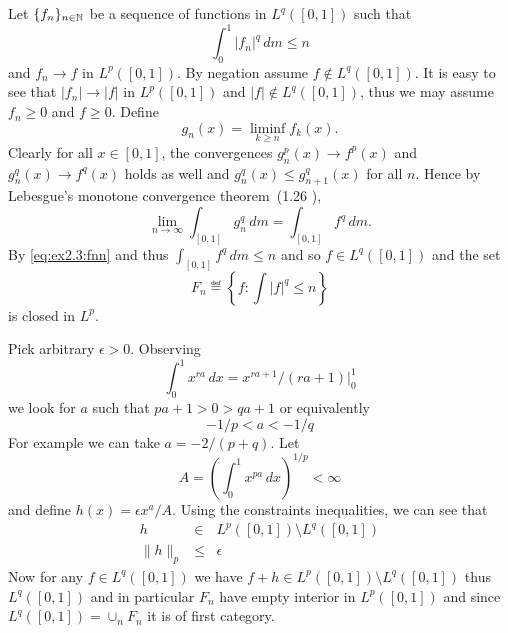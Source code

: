 \begin{enumerate}
\begin{itemize}
  Let \(\{f_n\}_{n\in\mathbb{N}}\) be a sequence of functions in \(L^q([0,1])\)
  such that 
  \begin{equation*} \label{eq:ex2.3:fnn}
  \int_0^1 |f_n|^q\,dm \leq n
  \end{equation*}
  and
  \(f_n\to f\) in \(L^p([0,1])\).
  By negation assume  \(f\notin L^q([0,1])\). 
  It is easy to see that
  \(|f_n|\to |f|\) in \(L^p([0,1])\) and 
  \(|f|\notin L^q([0,1])\), thus we may assume \(f_n\geq 0\) and \(f\geq 0\).
  Define 
  \begin{equation*}
  g_n(x) = \liminf_{k\geq n} f_k(x).
  \end{equation*}
  Clearly 
  for all \(x\in[0,1]\), the convergences
  \(g_n^p(x) \to f^p(x)\) and 
  \(g_n^q(x) \to f^q(x)\) holds as well and 
  \(g_n^q(x)\leq g_{n+1}^q(x)\) for all $n$. 
  Hence by Lebesgue's monotone convergence theorem~(1.26 \cite{RudinRCA80}),
  \begin{equation*}
    \lim_{n\to\infty} \int_{[0,1]} g_n^q \,dm  = \int_{[0,1]} f^q \,dm.
  \end{equation*}
  By \eqref{eq:ex2.3:fnn} and thus \(\int_{[0,1]} f^q \,dm \leq n\)
  and so \(f\in L^q([0,1])\) and the set 
  \begin{equation*}
  F_n \eqdef \left\{f: \int|f|^q\leq n\right\}
  \end{equation*}
  is closed in \(L^p\).

  Pick arbitrary \(\epsilon > 0\).
  Observing
  \begin{equation*}
  \int_0^1 x^{ra}\,dx = x^{ra+1}/(ra+1)\big|_0^1
  \end{equation*}
  we look for $a$ such that \(pa+1 > 0 > qa+1\) or equivalently
  \begin{equation*}
  -1/p < a < -1/q
  \end{equation*}
  For example we can take \(a = -2/(p+q)\).
  Let 
  \begin{equation*}
   A = \left(\int_0^1 x^{pa}\,dx\right)^{1/p} < \infty
  \end{equation*}
   and define
  \(h(x) = \epsilon x^a/A\). Using the constraints inequalities, we can see that 
  \begin{eqnarray*}
  h &\in& L^p([0,1]) \setminus L^q([0,1]) \\
  \|h\|_p &\leq& \epsilon
  \end{eqnarray*}
  Now for any \(f\in L^q([0,1])\) we have
  \(f+h\in L^p([0,1]) \setminus L^q([0,1])\) thus \(L^q([0,1])\)
  and in particular \(F_n\) have empty interior in \(L^p([0,1])\)
  and since \(L^q([0,1]) = \cup_n F_n\) it is of first category.


\end{itemize}
\end{enumerate}
